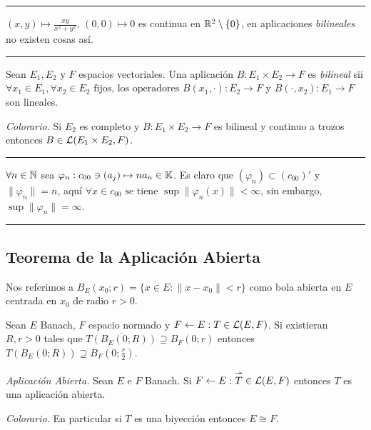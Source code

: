 \E 

\hrule
\begin{example}
    \((x,y)\mapsto \frac{xy}{x^2+y^2}\), \((0,0) \mapsto 0\) es continua en  \(\mathbb{R}^2\setminus \{0\}\), en aplicaciones \emph{bilineales} no existen cosas así. 
\end{example}
\hrule 

\E

\begin{definition}
    Sean \(E_1, E_2 \text{ y } F \) espacios vectoriales. Una aplicación \(B:E_1\times E_2 \to F\) es \emph{bilineal} sii \(\forall x_1\in E_1,\forall x_2\in E_2 \text{ fijos, los operadores }B(x_1,\cdot): E_2 \to F\) y \(B(\cdot,x_2): E_1\to F\) son lineales. 
\end{definition}

\begin{note}
    \emph{Colorario.} Si \(E_2\) es completo y \(B:E_1\times E_2 \to F \) es bilineal y continuo a trozos entonces \(B\in \mathcal{L}(E_1\times E_2, F)\).    
\end{note}

\E

\hrule 
\begin{example}
    \(\forall n\in\mathbb{N}\) sea \(\varphi_n: c_{00} \ni (a_j) \mapsto na_n \in \mathbb{K}\). Es claro que \((\varphi_n)\subset (c_{00})'\) y \(\|\varphi_n\|=n\), aquí \(\forall x\in c_{00} \text{ se tiene }\sup \|\varphi_n(x)\|<\infty\), sin embargo, \(\sup\|\varphi_n\|=\infty\). 
\end{example}
\hrule 

\E

\subsection*{Teorema de la Aplicación Abierta}

\begin{definition}
    Nos referimos a \(B_E(x_0;r)= \{x\in E: \|x-x_0\|<r\}\) como bola abierta en \(E\) centrada en \(x_0\) de radio \(r>0\). 
\end{definition}
\begin{proposition}
    Sean \(E\) Banach, \(F\) espacio normado y \(F\leftarrow E : T \in \mathcal{L}(E,F)\). Si existieran \(R,r >0\) tales que \(\overline{T(B_E(0;R))}\supseteq B_F(0;r)\) entonces \(T(B_E(0;R)) \supseteq B_F\left(0;\frac{r}{2}\right)\).  
\end{proposition}
\begin{theorem}
    \emph{Aplicación Abierta.} Sean \(E\text{ e }F\) Banach. Si \(F \leftarrow E:\overset{\twoheadrightarrow}{T}\in \mathcal{L}(E,F)\) entonces \(T\) es una aplicación abierta.  
\end{theorem}
\begin{note}
    \emph{Colorario.} En particular si \(T\) es una biyección entonces \(E\cong F\).  
\end{note}


